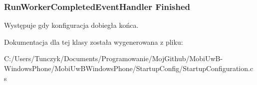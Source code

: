 \subsubsection[{Finished}]{\setlength{\rightskip}{0pt plus 5cm}Run\+Worker\+Completed\+Event\+Handler Finished}\label{a00061_a6596c632c512997cf57f6854196c74a4}


Występuje gdy konfiguracja dobiegła końca. 



Dokumentacja dla tej klasy została wygenerowana z pliku\+:\begin{DoxyCompactItemize}
\item 
C\+:/\+Users/\+Tunczyk/\+Documents/\+Programowanie/\+Moj\+Github/\+Mobi\+Uw\+B-\/\+Windows\+Phone/\+Mobi\+Uw\+B\+Windows\+Phone/\+Startup\+Config/Startup\+Configuration.\+cs\end{DoxyCompactItemize}
